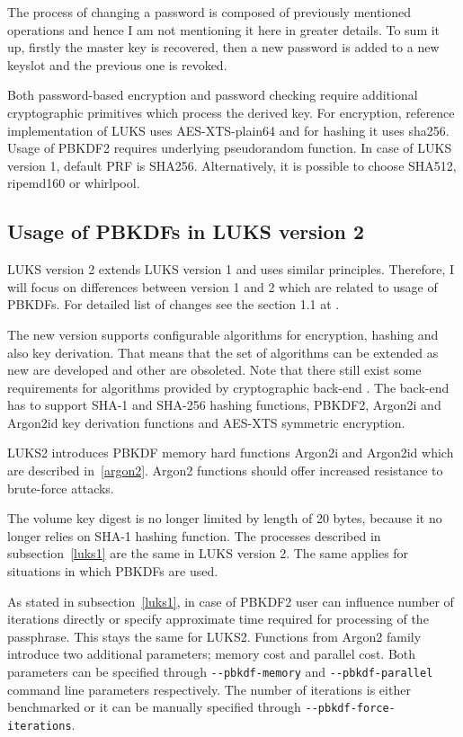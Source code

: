 \documentclass[nolof,digital]{fithesis3}
\begin{document}
The process of changing a password is composed of previously mentioned operations and hence I am not mentioning it here in greater details. To sum it up, firstly the master key is recovered, then a new password is added to a new keyslot and the previous one is revoked.

Both password-based encryption and password checking require additional cryptographic primitives which process the derived key. For encryption, reference implementation of LUKS uses AES-XTS-plain64 and for hashing it uses sha256. Usage of PBKDF2 requires underlying pseudorandom function. In case of LUKS version 1, default PRF is SHA256. Alternatively, it is possible to choose SHA512, ripemd160 or whirlpool.

\subsection{Usage of PBKDFs in LUKS version 2}
\label{luks2pbkdf}
LUKS version 2 extends LUKS version 1 and uses similar principles. Therefore, I will focus on differences between version 1 and 2 which are related to usage of PBKDFs. For detailed list of changes see the section 1.1 at \parencite{luks2}.

The new version supports configurable algorithms for encryption, hashing and also key derivation. That means that the set of algorithms can be extended as new are developed and other are obsoleted. Note that there still exist some requirements for algorithms provided by cryptographic back-end \parencite{luks2}. The back-end has to support SHA-1 and SHA-256 hashing functions, PBKDF2, Argon2i and Argon2id key derivation functions and AES-XTS symmetric encryption.

LUKS2 introduces PBKDF memory hard functions Argon2i and Argon2id which are described in~\ref{argon2}. Argon2 functions should offer increased resistance to brute-force attacks.

The volume key digest is no longer limited by length of 20 bytes, because it no longer relies on SHA-1 hashing function. The processes described in subsection~\ref{luks1} are the same in LUKS version 2. The same applies for situations in which PBKDFs are used. 

As stated in subsection~\ref{luks1},  in case of PBKDF2 user can influence number of iterations directly or specify approximate time required for processing of the passphrase. This stays the same for LUKS2. Functions from Argon2 family introduce two additional parameters; memory cost and parallel cost. Both parameters can be specified through \verb+--pbkdf-memory+ and \verb+--pbkdf-parallel+ command line parameters respectively. The number of iterations is either benchmarked or it can be manually specified through \verb+--pbkdf-force-iterations+.
\end{document}
